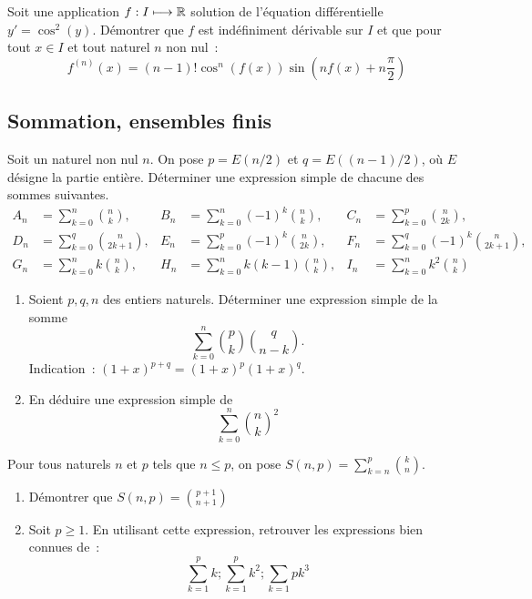 \begin{exercice}
    Soit une application \(f : I \longmapsto \mathbb{R}\) solution de l'équation différentielle \(y' = \cos^2(y)\). Démontrer que \(f\) est indéfiniment dérivable sur \(I\) et que pour tout \(x \in I\) et tout naturel \(n\) non nul~: \[f^{(n)}(x) = (n-1)! \cos^n(f(x)) \sin\left(nf(x) + n\frac{\pi}{2}\right)\]
\end{exercice}
\subsection{Sommation, ensembles finis}
\begin{exercice}
    Soit un naturel non nul \(n\). On pose \(p = E(n/2)\) et \(q = E((n-1)/2)\), où \(E\) désigne la partie entière. Déterminer une expression simple de chacune des sommes suivantes.
    \begin{align*}
        A_n &= \sum_{k=0}^n \binom{n}{k}, & B_n&=\sum_{k=0}^n (-1)^k\binom{n}{k}, & C_n&=\sum_{k=0}^p \binom{n}{2k}, \\
        D_n &= \sum_{k=0}^q \binom{n}{2k+1}, & E_n&=\sum_{k=0}^p (-1)^k\binom{n}{2k}, & F_n&=\sum_{k=0}^q (-1)^k\binom{n}{2k+1}, \\
        G_n &= \sum_{k=0}^n k\binom{n}{k}, & H_n&=\sum_{k=0}^n k(k-1)\binom{n}{k}, & I_n&=\sum_{k=0}^n k^2\binom{n}{k}
    \end{align*}
\end{exercice}
\begin{exercice}
    \begin{enumerate}
        \item Soient \(p, q, n\) des entiers naturels. Déterminer une expression simple de la somme \[\sum_{k=0}^n \binom{p}{k}\binom{q}{n-k}.\] Indication~: \((1+x)^{p+q} = (1+x)^p (1+x)^q\).
        \item En déduire une expression simple de \[\sum_{k=0}^n \binom{n}{k}^2\]
    \end{enumerate}
\end{exercice}
\begin{exercice}
    Pour tous naturels \(n\) et \(p\) tels que \(n \leqslant p\), on pose \(S(n,p) = \sum_{k=n}^p \binom{k}{n}\).
    \begin{enumerate}
        \item Démontrer que \(S(n,p) = \binom{p+1}{n+1}\)
        \item Soit \(p \geqslant 1\). En utilisant cette expression, retrouver les expressions bien connues de~:\[\sum_{k=1}^p k ; \sum_{k=1}^p k^2 ; \sum_{k=1}{p} k^3\]
    \end{enumerate}
\end{exercice}
